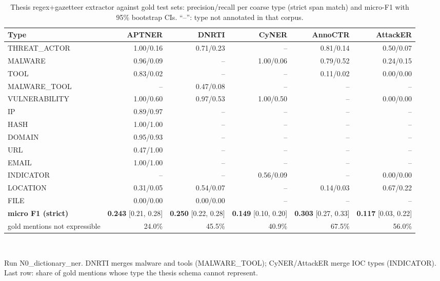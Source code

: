 \begin{table}[t]
\centering
\caption{Thesis regex+gazetteer extractor against gold test sets: precision/recall per coarse type (strict span match) and micro-F1 with 95\% bootstrap CIs. ``--'': type not annotated in that corpus.}
\label{tab:gazetteer}
\small
\begin{adjustbox}{max width=\linewidth}
\begin{tabular}{lrrrrr}
\toprule
Type & APTNER & DNRTI & CyNER & AnnoCTR & AttackER \\
\midrule
THREAT\_ACTOR & 1.00/0.16 & 0.71/0.23 & -- & 0.81/0.14 & 0.50/0.07 \\
MALWARE & 0.96/0.09 & -- & 1.00/0.06 & 0.79/0.52 & 0.24/0.15 \\
TOOL & 0.83/0.02 & -- & -- & 0.11/0.02 & 0.00/0.00 \\
MALWARE\_TOOL & -- & 0.47/0.08 & -- & -- & -- \\
VULNERABILITY & 1.00/0.60 & 0.97/0.53 & 1.00/0.50 & -- & 0.00/0.00 \\
IP & 0.89/0.97 & -- & -- & -- & -- \\
HASH & 1.00/1.00 & -- & -- & -- & -- \\
DOMAIN & 0.95/0.93 & -- & -- & -- & -- \\
URL & 0.47/1.00 & -- & -- & -- & -- \\
EMAIL & 1.00/1.00 & -- & -- & -- & -- \\
INDICATOR & -- & -- & 0.56/0.09 & -- & 0.00/0.00 \\
LOCATION & 0.31/0.05 & 0.54/0.07 & -- & 0.14/0.03 & 0.67/0.22 \\
FILE & 0.00/0.00 & 0.00/0.00 & -- & -- & -- \\
\textbf{micro F1 (strict)} & \textbf{0.243} [0.21, 0.28] & \textbf{0.250} [0.22, 0.28] & \textbf{0.149} [0.10, 0.20] & \textbf{0.303} [0.27, 0.33] & \textbf{0.117} [0.03, 0.22] \\
gold mentions not expressible & 24.0\% & 45.5\% & 40.9\% & 67.5\% & 56.0\% \\
\bottomrule
\end{tabular}
\end{adjustbox}
\\[2pt]\parbox{\linewidth}{\footnotesize Run N0\_dictionary\_ner. DNRTI merges malware and tools (MALWARE\_TOOL); CyNER/AttackER merge IOC types (INDICATOR). Last row: share of gold mentions whose type the thesis schema cannot represent.}
\end{table}